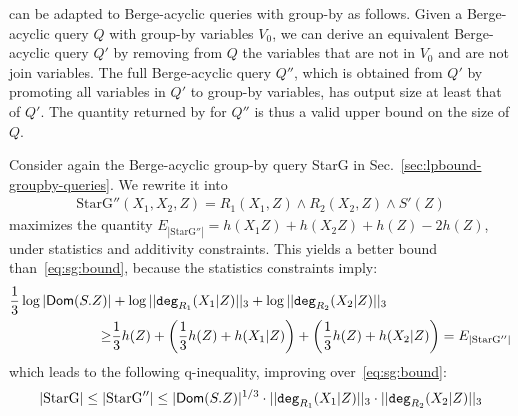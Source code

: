 \lptdb can be adapted to Berge-acyclic queries with group-by as follows. Given a Berge-acyclic query $Q$ with group-by variables $V_0$, we can derive an equivalent Berge-acyclic query $Q'$ by removing from $Q$ the variables that are not in $V_0$ and are not join variables. The full Berge-acyclic query $Q''$, which is obtained from $Q'$ by promoting all variables in $Q'$ to group-by variables, has output size at least that of $Q'$. The quantity returned by \lptdb for $Q''$ is thus a valid upper bound on the size of $Q$.
\begin{example}
    Consider again the Berge-acyclic group-by query StarG in Sec.~\ref{sec:lpbound-groupby-queries}. We rewrite it into 
    \begin{align*}
        \text{StarG}''(X_1,X_2,Z) = R_1(X_1,Z)\wedge R_2(X_2,Z)\wedge S'(Z)
    \end{align*}
    \lptdb maximizes the quantity
    $E_{|\text{StarG}''|} = h(X_1Z) + h(X_2Z) + h(Z) - 2h(Z)$, under
    statistics and additivity constraints.  This yields a better bound
    than~\eqref{eq:sg:bound}, because the statistics constraints
    imply:
    \begin{align*}
      \frac{1}{3}  \log |\textsf{Dom}(S.Z)|  & + \log ||\texttt{deg}_{R_1}(X_1|Z)||_3   + \log ||\texttt{deg}_{R_2}(X_2|Z)||_3 \\
 \geq & \frac{1}{3}h(Z) + \left(\frac{1}{3}h(Z)+h(X_1|Z)\right)+\left(\frac{1}{3}h(Z) + h(X_2|Z)\right)=E_{|\text{StarG}''|}
    \end{align*}
    which leads to the following q-inequality, improving
    over~\eqref{eq:sg:bound}:
    \begin{align*}
      |\text{StarG}| \leq |\text{StarG}''| 
      \leq |\textsf{Dom}(S.Z)|^{1/3}\cdot ||\texttt{deg}_{R_1}(X_1|Z)||_3\cdot||\texttt{deg}_{R_2}(X_2|Z)||_3
    \end{align*}
% 
\end{example}

